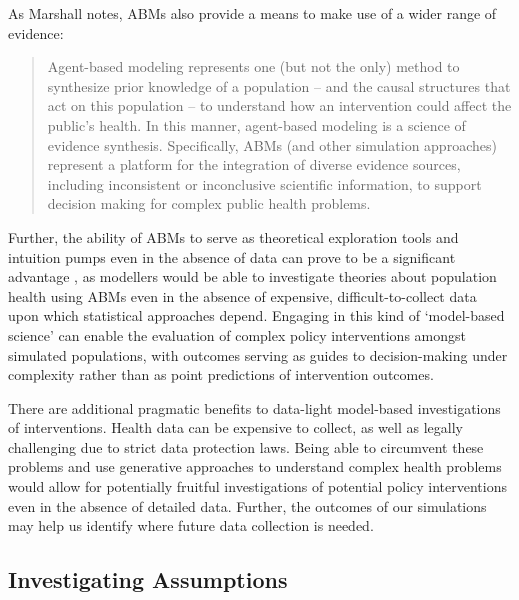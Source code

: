\documentclass[review]{elsarticle}
\begin{document}
As Marshall notes, ABMs also provide a means to make use of a wider range of evidence: 

\begin{quote}
Agent-based modeling represents one (but not the only) method to synthesize prior knowledge of a population -- and the causal structures that act on this population -- to understand how an intervention could affect the public's health. In this manner, agent-based modeling is a science of evidence synthesis. Specifically, ABMs (and other simulation approaches) represent a platform for the integration of diverse evidence sources, including inconsistent or inconclusive scientific information, to support decision making for complex public health problems. \citep{marshall2017}
\end{quote}

Further, the ability of ABMs to serve as theoretical exploration tools and intuition pumps even in the absence of data can prove to be a significant advantage \citep{silverman2011}, as modellers would be able to investigate theories about population health using ABMs even in the absence of expensive, difficult-to-collect data upon which statistical approaches depend.  Engaging in this kind of `model-based science' can enable the evaluation of complex policy interventions amongst simulated populations, with outcomes serving as guides to decision-making under complexity rather than as point predictions of intervention outcomes. 

There are additional pragmatic benefits to data-light model-based investigations of interventions.  Health data can be expensive to collect, as well as legally challenging due to strict data protection laws.  Being able to circumvent these problems and use generative approaches to understand complex health problems would allow for potentially fruitful investigations of potential policy interventions even in the absence of detailed data.  Further, the outcomes of our simulations may help us identify where future data collection is needed.  

\subsection{Investigating Assumptions}
\end{document}
